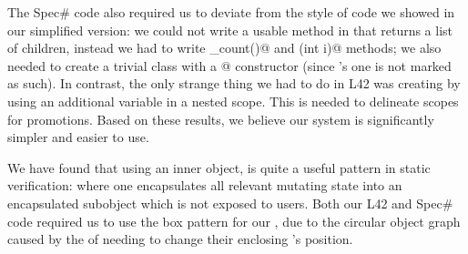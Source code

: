 




\noindent The Spec\# code also required us to deviate from the style of code we showed in our simplified version: we could not write a usable \Q@children@ method in \Q@Widget@ that returns a list of children, instead we had to write \Q@children_count()@ and \Q@children(int i)@ methods; we also needed to create a trivial class with a \Q@[Pure]@ constructor (since \Q@Object@'s one is not marked as such). In contrast, the only strange thing we had to do in L42 was creating \Q@Box@es by using 
an additional variable in a nested scope.
This is needed to delineate scopes for promotions.
Based on these results, we believe our system is significantly simpler and easier to use.

We have found that using an inner \Q@Box@ object, is quite a useful pattern in static verification: where one encapsulates all relevant mutating state into an encapsulated subobject which is not exposed to users.
Both our L42 and Spec\# code required us to use the box pattern for our \Q@SafeMovable@, due to the circular object graph caused by the \Q@Action@s of \Q@Button@s needing to change their enclosing \Q@SafeMovable@'s position.
